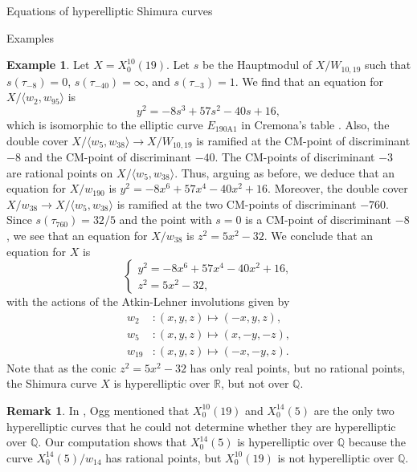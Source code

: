 \documentclass{amsart}
\newcounter{lemma}
\theoremstyle{definition}
\newtheorem{Example}[lemma]{Example}
\newtheorem{Remark}[lemma]{Remark}
\def\Q{\mathbb Q}
\def\R{\mathbb R}
\def\gen#1{\langle #1\rangle}
\begin{document}
\begin{section}{Equations of hyperelliptic Shimura curves}
\begin{subsection}{Examples}
\begin{Example} Let $X=X_0^{10}(19)$. Let $s$ be the Hauptmodul of
  $X/W_{10,19}$ such that $s(\tau_{-8})=0$, $s(\tau_{-40})=\infty$,
  and $s(\tau_{-3})=1$. We find that an equation for
  $X/\gen{w_2,w_{95}}$ is
  $$
    y^2=-8s^3+57s^2-40s+16,
  $$
  which is isomorphic to the elliptic curve $E_{\text{190A1}}$ in Cremona's table
  \cite{Cremona}. Also, the double cover $X/\gen{w_5,w_{38}}\to
  X/W_{10,19}$ is ramified at the CM-point of discriminant $-8$ and
  the CM-point of discriminant $-40$. The CM-points of discriminant
  $-3$ are rational points on $X/\gen{w_5,w_{38}}$. Thus, arguing as
  before, we deduce that an equation for $X/w_{190}$ is
  $y^2=-8x^6+57x^4-40x^2+16$. Moreover, the double cover $X/w_{38}\to
  X/\gen{w_5,w_{38}}$ is ramified at the two CM-points of discriminant
  $-760$. Since $s(\tau_{760})=32/5$ and the point with $s=0$ is a
  CM-point of discriminant $-8$, we see that an equation for $X/w_{38}$ is
  $z^2=5x^2-32$. We conclude that an equation for $X$ is
  $$
    \begin{cases}
    y^2=-8x^6+57x^4-40x^2+16, \\
    z^2=5x^2-32, \end{cases}
  $$
  with the actions of the Atkin-Lehner involutions given by
  \begin{equation*}
  \begin{split}
    w_2&:(x,y,z)\mapsto(-x,y,z), \\
    w_5&:(x,y,z)\mapsto(x,-y,-z), \\
    w_{19}&:(x,y,z)\mapsto(-x,-y,z).
  \end{split}
  \end{equation*}
  Note that as the conic $z^2=5x^2-32$ has only real points, but no
  rational points, the Shimura curve $X$ is hyperelliptic over $\R$,
  but not over $\Q$.
\end{Example}

\begin{Remark}
  In \cite{Ogg}, Ogg mentioned that $X_0^{10}(19)$ and
  $X_0^{14}(5)$ are the only two hyperelliptic curves that he could not
  determine whether they are hyperelliptic over $\Q$. Our computation
  shows that $X_0^{14}(5)$ is hyperelliptic over $\Q$ because the
  curve $X_0^{14}(5)/w_{14}$ has rational points, but $X_0^{10}(19)$
  is not hyperelliptic over $\Q$.
\end{Remark}


\end{subsection}
\end{section}
\end{document}
